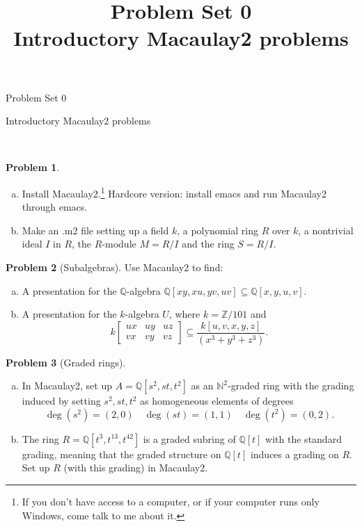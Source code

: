 \documentclass[11pt]{article}
\title{}
\date{\vspace{-0.5in}}
\title{Problem Set 0 \\ Introductory Macaulay2 problems}
\theoremstyle{definition}
\newtheorem{problem}{Problem}
\begin{document}
\thispagestyle{fancy}
\pagestyle{fancy}


\begin{center}
	{\LARGE Problem Set 0\\
	
	\vspace{0.5em}
	
	Introductory Macaulay2 problems}
\end{center}

\


\begin{problem} $\,$
\begin{enumerate}[a)]
	\item Install Macaulay2.\footnote{If you don't have access to a computer, or if your computer runs only Windows, come talk to me about it.} Hardcore version: install emacs and run Macaulay2 through emacs.
	\item Make an .m2 file setting up a field $k$, a polynomial ring $R$ over $k$, a nontrivial ideal $I$ in $R$, the $R$-module $M = R/I$ and the ring $S = R/I$.
\end{enumerate}
\end{problem}




\begin{problem}[Subalgebras]
	Use Macaulay2 to find:
	\begin{enumerate}[a)]
		\item A presentation for the $\mathbb{Q}$-algebra $\mathbb{Q}[xy,xu,yv,uv] \subseteq \mathbb{Q}[x,y,u,v]$.
		\item A presentation for the $k$-algebra $U$, where $k = \mathbb{Z}/101$ and
		$$k \begin{bmatrix} ux & uy & uz \\ vx & vy & vz \end{bmatrix} \subseteq \frac{k[u,v,x,y,z]}{(x^3+y^3+z^3)}.$$
	\end{enumerate}
\end{problem}



\begin{problem}[Graded rings]
$\,$
	\begin{enumerate}[a)]
		\item In Macaulay2, set up $A = \mathbb{Q}[s^2,st,t^2]$ as an $\mathbb{N}^2$-graded ring with the grading induced by setting $s^2, st, t^2$ as homogeneous elements of degrees
		$$\deg(s^2) = (2,0) \quad \deg(st) = (1,1) \quad \deg(t^2) = (0,2).$$
		\item The ring $R=\mathbb{Q}[t^3,t^{13},t^{42}]$ is a graded subring of $\mathbb{Q}[t]$ with the standard grading, meaning that the graded structure on $\mathbb{Q}[t]$ induces a grading on $R$. Set up $R$ (with this grading) in Macaulay2.
	\end{enumerate}
\end{problem}
\end{document}
